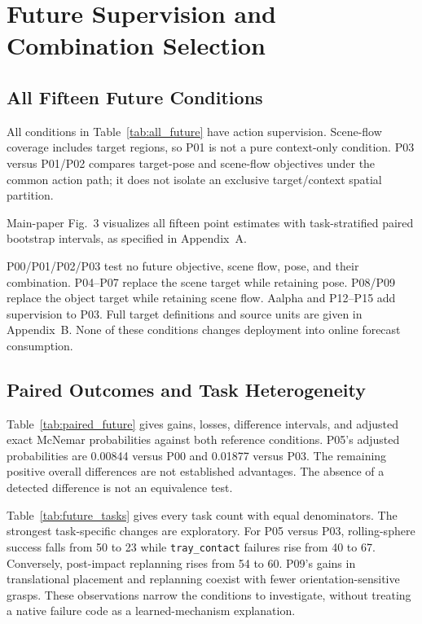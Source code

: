 \section{Future Supervision and Combination Selection}
\label{app:q2}

\subsection{All Fifteen Future Conditions}
All conditions in Table~\ref{tab:all_future} have action supervision.
Scene-flow coverage includes target regions, so P01 is not a pure
context-only condition. P03 versus P01/P02 compares target-pose and scene-flow
objectives under the common action path; it does not isolate an
exclusive target/context spatial partition.

Main-paper Fig.~3 visualizes all fifteen point estimates with task-stratified
paired bootstrap intervals, as specified in Appendix~A.

P00/P01/P02/P03 test no future objective, scene flow, pose, and their
combination. P04--P07 replace the scene target while retaining pose.
P08/P09 replace the object target while retaining scene flow.
Aalpha and P12--P15 add supervision to P03. Full target definitions
and source units are given in Appendix~B. None of these conditions changes
deployment into online forecast consumption.

\subsection{Paired Outcomes and Task Heterogeneity}
Table~\ref{tab:paired_future} gives gains, losses, difference intervals, and
adjusted exact McNemar probabilities against both reference conditions. P05's adjusted
probabilities are 0.00844 versus P00 and 0.01877 versus P03.
The remaining positive overall differences are not established advantages.
The absence of a detected difference is not an equivalence test.



Table~\ref{tab:future_tasks} gives every task count with equal denominators.
The strongest task-specific changes are exploratory. For P05 versus P03,
rolling-sphere success falls from 50 to 23 while \texttt{tray\_contact}
failures rise from 40 to 67. Conversely, post-impact replanning rises
from 54 to 60. P09's gains in translational placement and replanning
coexist with fewer orientation-sensitive grasps. These observations narrow
the conditions to investigate, without treating a native failure code as
a learned-mechanism explanation.



